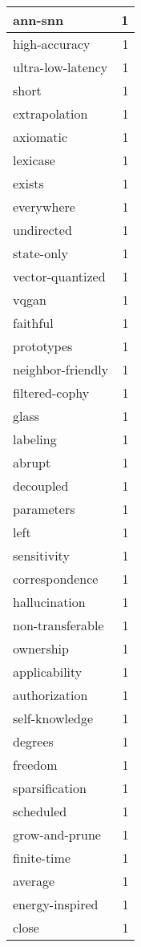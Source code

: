 \begin{table}[h]
\begin{tabular}{|l|r|}
\hline
ann-snn & 1 \\
\hline
high-accuracy & 1 \\
\hline
ultra-low-latency & 1 \\
\hline
short & 1 \\
\hline
extrapolation & 1 \\
\hline
axiomatic & 1 \\
\hline
lexicase & 1 \\
\hline
exists & 1 \\
\hline
everywhere & 1 \\
\hline
undirected & 1 \\
\hline
state-only & 1 \\
\hline
vector-quantized & 1 \\
\hline
vqgan & 1 \\
\hline
faithful & 1 \\
\hline
prototypes & 1 \\
\hline
neighbor-friendly & 1 \\
\hline
filtered-cophy & 1 \\
\hline
glass & 1 \\
\hline
labeling & 1 \\
\hline
abrupt & 1 \\
\hline
decoupled & 1 \\
\hline
parameters & 1 \\
\hline
left & 1 \\
\hline
sensitivity & 1 \\
\hline
correspondence & 1 \\
\hline
hallucination & 1 \\
\hline
non-transferable & 1 \\
\hline
ownership & 1 \\
\hline
applicability & 1 \\
\hline
authorization & 1 \\
\hline
self-knowledge & 1 \\
\hline
degrees & 1 \\
\hline
freedom & 1 \\
\hline
sparsification & 1 \\
\hline
scheduled & 1 \\
\hline
grow-and-prune & 1 \\
\hline
finite-time & 1 \\
\hline
average & 1 \\
\hline
energy-inspired & 1 \\
\hline
close & 1 \\

\end{tabular}
\end{table}
